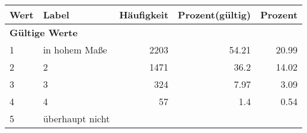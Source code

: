      \begin{longtable}{lXrrr}
     \toprule
     \textbf{Wert} & \textbf{Label} & \textbf{Häufigkeit} & \textbf{Prozent(gültig)} & \textbf{Prozent} \\
     \endhead
     \midrule
     \multicolumn{5}{l}{\textbf{Gültige Werte}}\\

     1 &
     \multicolumn{1}{X}{ in hohem Maße   } &


       \num{2203} &
       \num[round-mode=places,round-precision=2]{54.21} &
         \num[round-mode=places,round-precision=2]{20.99} \\

     2 &
     \multicolumn{1}{X}{ 2   } &


       \num{1471} &
       \num[round-mode=places,round-precision=2]{36.2} &
         \num[round-mode=places,round-precision=2]{14.02} \\

     3 &
     \multicolumn{1}{X}{ 3   } &


       \num{324} &
       \num[round-mode=places,round-precision=2]{7.97} &
         \num[round-mode=places,round-precision=2]{3.09} \\

     4 &
     \multicolumn{1}{X}{ 4   } &


       \num{57} &
       \num[round-mode=places,round-precision=2]{1.4} &
         \num[round-mode=places,round-precision=2]{0.54} \\

     5 &
     \multicolumn{1}{X}{ überhaupt nicht   } &



\end{longtable}
